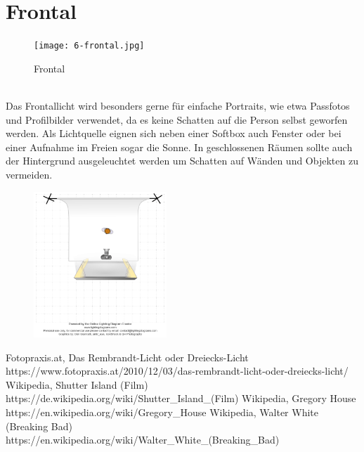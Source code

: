 \documentclass[landscape, notoc]{school}
\begin{document}
\section{Frontal}
\begin{minipage}[t]{.55\textwidth}
\begin{figure}[H]
	\centering
	\texttt{[image: 6-frontal.jpg]}
	\caption{Frontal}
\end{figure}
\end{minipage}
\begin{minipage}[t]{.45\textwidth}~\\
Das Frontallicht wird besonders gerne für einfache Portraits, wie etwa Passfotos und Profilbilder verwendet, da es keine Schatten auf die Person selbst geworfen werden. Als Lichtquelle eignen sich neben einer Softbox auch Fenster oder bei einer Aufnahme im Freien sogar die Sonne. In geschlossenen Räumen sollte auch der Hintergrund ausgeleuchtet werden um Schatten auf Wänden und Objekten zu vermeiden.
\begin{figure}[H]
	\centering
	\includegraphics[width=5cm]{6-frontal-diagram.png}
\end{figure}
\end{minipage}

\newpage
\listoffigures

\begin{thebibliography}{9}
 Fotopraxis.at, Das Rembrandt-Licht oder Dreiecks-Licht \\ https://www.fotopraxis.at/2010/12/03/das-rembrandt-licht-oder-dreiecks-licht/
 Wikipedia, Shutter Island (Film) \\ https://de.wikipedia.org/wiki/Shutter\_Island\_(Film)
 Wikipedia, Gregory House \\ https://en.wikipedia.org/wiki/Gregory\_House
 Wikipedia, Walter White (Breaking Bad) \\ https://en.wikipedia.org/wiki/Walter\_White\_(Breaking\_Bad)
\end{thebibliography}
\end{document}
